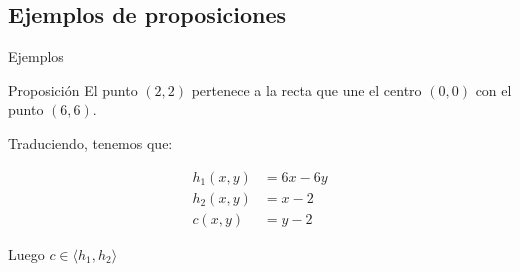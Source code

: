 \documentclass[10pt]{beamer}
\newcommand{\gen}[1]{\ensuremath{\langle #1\rangle}}
\begin{document}
\subsection{Ejemplos de proposiciones}
\begin{frame}{Ejemplos}

	\begin{block}{Proposición}
		El punto $(2,2)$ pertenece a la recta que une el centro $(0,0)$ con el punto $(6,6)$.
	\end{block}

	Traduciendo, tenemos que:

	\begin{align*} 
		h_1(x,y)                 &= 6x-6y\\
		h_2(x,y)                 &= x-2\\
		c(x,y)                   &= y-2
	\end{align*}

	Luego $c \in \gen{h_1,h_2}$
\end{frame}
\end{document}
